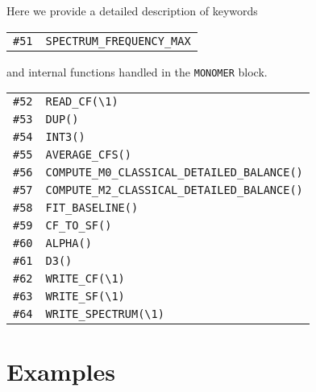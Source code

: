 \documentclass[color]{article}
\begin{document}
Here we provide a detailed description of keywords 
%
\begin{table}[H]
  \begin{tabular}{ll}
    \texttt{\#51} & \texttt{SPECTRUM\_FREQUENCY\_MAX}
  \end{tabular}
\end{table}
%
and internal functions handled in the \texttt{MONOMER} block.
%
\begin{table}[H]
  \begin{tabular}{ll}
    \texttt{\#52} & \texttt{READ\_CF(\textbackslash 1)} \\
    \texttt{\#53} & \texttt{DUP()} \\
    \texttt{\#54} & \texttt{INT3()} \\
    \texttt{\#55} & \texttt{AVERAGE\_CFS()} \\
    \texttt{\#56} & \texttt{COMPUTE\_M0\_CLASSICAL\_DETAILED\_BALANCE()} \\
    \texttt{\#57} & \texttt{COMPUTE\_M2\_CLASSICAL\_DETAILED\_BALANCE()} \\
    \texttt{\#58} & \texttt{FIT\_BASELINE()} \\
    \texttt{\#59} & \texttt{CF\_TO\_SF()} \\
    \texttt{\#60} & \texttt{ALPHA()} \\
    \texttt{\#61} & \texttt{D3()} \\
    \texttt{\#62} & \texttt{WRITE\_CF(\textbackslash 1)} \\
    \texttt{\#63} & \texttt{WRITE\_SF(\textbackslash 1)} \\
    \texttt{\#64} & \texttt{WRITE\_SPECTRUM(\textbackslash 1)} \\
  \end{tabular}
\end{table}

\section{Examples}
\label{sec:serial-examples}
\end{document}
